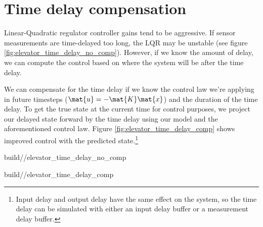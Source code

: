 \section{Time delay compensation}

Linear-Quadratic regulator controller gains tend to be aggressive. If sensor
measurements are time-delayed too long, the LQR may be unstable (see figure
\ref{fig:elevator_time_delay_no_comp}). However, if we know the amount of delay,
we can compute the control based on where the system will be after the time
delay.

We can compensate for the time delay if we know the control law we're applying
in future timesteps ($\mat{u} = -\mat{K}\mat{x}$) and the duration of the time
delay. To get the true state at the current time for control purposes, we
project our delayed state forward by the time delay using our model and the
aforementioned control law. Figure \ref{fig:elevator_time_delay_comp} shows
improved control with the predicted state.\footnote{Input delay and output delay
have the same effect on the system, so the time delay can be simulated with
either an input delay buffer or a measurement delay buffer.}
\begin{bookfigure}
  \begin{minisvg}{2}{build/\chapterpath/elevator_time_delay_no_comp}
    \caption{Elevator response at 5 ms sample period with 50 ms of output lag}
    \label{fig:elevator_time_delay_no_comp}
  \end{minisvg}
  \hfill
  \begin{minisvg}{2}{build/\chapterpath/elevator_time_delay_comp}
    \caption{Elevator response at 5 ms sample period with 50 ms of output lag
      (delay-compensated)}
    \label{fig:elevator_time_delay_comp}
  \end{minisvg}
\end{bookfigure}


